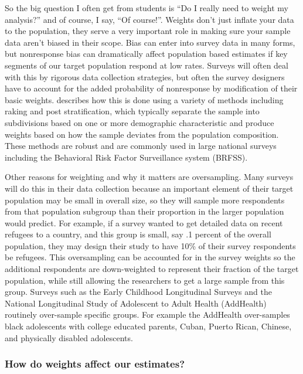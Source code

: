 \documentclass[
]{article}
\begin{document}
So the big question I often get from students is ``Do I really need to weight my analysis?'' and of course, I say, ``Of course!''. Weights don't just inflate your data to the population, they serve a very important role in making sure your sample data aren't biased in their scope. Bias can enter into survey data in many forms, but nonresponse bias can dramatically affect population based estimates if key segments of our target population respond at low rates. Surveys will often deal with this by rigorous data collection strategies, but often the survey designers have to account for the added probability of nonresponse by modification of their basic weights. \citet{Lohr2019} describes how this is done using a variety of methods including raking and post stratification, which typically separate the sample into subdivisions based on one or more demographic characteristic and produce weights based on how the sample deviates from the population composition. These methods are robust and are commonly used in large national surveys including the Behavioral Risk Factor Surveillance system (BRFSS).

Other reasons for weighting and why it matters are oversampling. Many surveys will do this in their data collection because an important element of their target population may be small in overall size, so they will sample more respondents from that population subgroup than their proportion in the larger population would predict. For example, if a survey wanted to get detailed data on recent refugees to a country, and this group is small, say .1 percent of the overall population, they may design their study to have 10\% of their survey respondents be refugees. This oversampling can be accounted for in the survey weights so the additional respondents are down-weighted to represent their fraction of the target population, while still allowing the researchers to get a large sample from this group. Surveys such as the Early Childhood Longitudinal Surveys and the National Longitudinal Study of Adolescent to Adult Health (AddHealth) routinely over-sample specific groups. For example the AddHealth over-samples black adolescents with college educated parents, Cuban, Puerto Rican, Chinese, and physically disabled adolescents.

\hypertarget{how-do-weights-affect-our-estimates}{%
\subsubsection{How do weights affect our estimates?}\label{how-do-weights-affect-our-estimates}}
\end{document}
